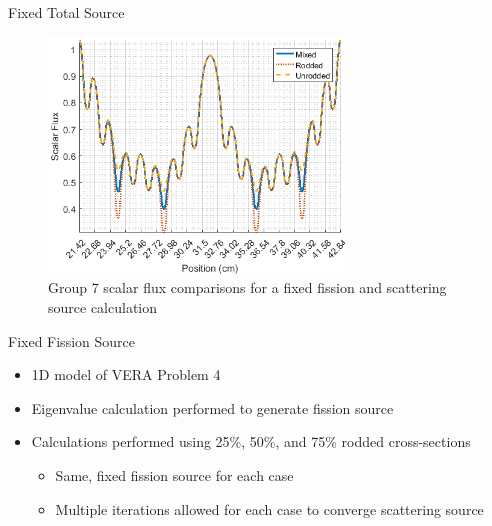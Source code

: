 
\begin{frame}[t]{Fixed Total Source}

\begin{figure}[H]
    \centering
    \includegraphics[width=0.7\textwidth]{../figs/1dmoc-50mix-fixedscat-scalflux7.png}
    \caption{Group 7 scalar flux comparisons for a fixed fission and scattering source calculation}\label{f:1dmoc-fixed-50-scalflux7}
\end{figure}

\end{frame}


\begin{frame}[t]{Fixed Fission Source}
    
    \begin{itemize}
      \item 1D model of VERA Problem 4
      \item Eigenvalue calculation performed to generate fission source
      \item Calculations performed using 25\%, 50\%, and 75\% rodded 
      cross-sections
      \begin{itemize}
        \item Same, fixed fission source for each case
        \item Multiple iterations allowed for each case to converge scattering 
        source
      \end{itemize}
    \end{itemize}
    
\end{frame}


